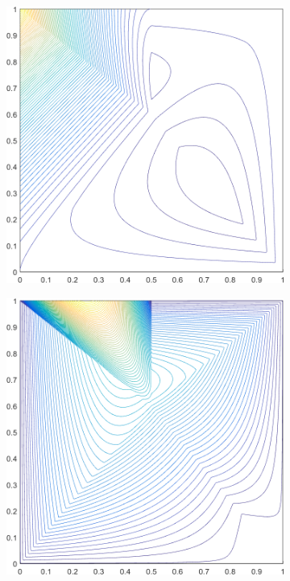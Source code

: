\begin{figure}
\centering
{
	\begin{subfigure}[b]{0.375\textwidth}
		\centering
		\includegraphics[width=\textwidth]{figures/sec_BF/deg_square_PWLD2_contour_b5.png}
	\end{subfigure}
	\hspace{1.5cm}
	\begin{subfigure}[b]{0.375\textwidth}
		\centering
		\includegraphics[width=\textwidth]{figures/sec_BF/deg_square_PWLD2_contour_b9.png}

\end{subfigure}}
\end{figure}
